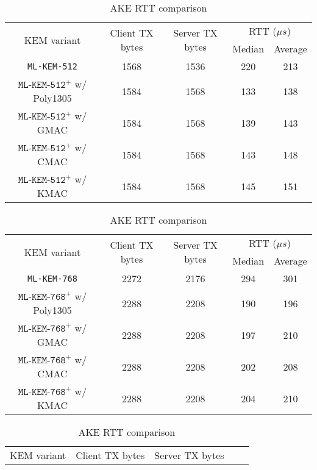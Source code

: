 \documentclass[journal=tches,submission]{iacrtrans}
\newcommand{\us}{\mu s}
\begin{document}
\begin{table}[h]
    \centering
    \footnotesize
    \caption{AKE RTT comparison}\label{tbl:ake-rtt}
    \begin{tabular}{|c|c|c|c|c|}
        \hline
        \multirow{2}{*}{KEM variant}
        & \multirow{2}{*}{Client TX bytes}
        & \multirow{2}{*}{Server TX bytes}
        & \multicolumn{2}{|c|}{RTT ($\us$)} \\
        \cline{4-5}
        & & & Median & Average \\
        \hline
        \texttt{ML-KEM-512} & 1568 & 1536 & 220 & 213 \\
        \hline
        $\texttt{ML-KEM-512}^+$ w/ Poly1305 & 1584 & 1568 & 133 & 138 \\
        \hline
        $\texttt{ML-KEM-512}^+$ w/ GMAC & 1584 & 1568 & 139 & 143 \\
        \hline
        $\texttt{ML-KEM-512}^+$ w/ CMAC & 1584 & 1568 & 143 & 148 \\
        \hline
        $\texttt{ML-KEM-512}^+$ w/ KMAC & 1584 & 1568 & 145 & 151 \\
        \hline
    \end{tabular}\vspace{0.3cm}
    \begin{tabular}{|c|c|c|c|c|}
        \hline
        \multirow{2}{*}{KEM variant}
        & \multirow{2}{*}{Client TX bytes}
        & \multirow{2}{*}{Server TX bytes}
        & \multicolumn{2}{|c|}{RTT ($\us$)} \\
        \cline{4-5}
        & & & Median & Average \\
        \hline
        \texttt{ML-KEM-768} & 2272 & 2176 & 294 & 301 \\
        \hline
        $\texttt{ML-KEM-768}^+$ w/ Poly1305 & 2288 & 2208 & 190 & 196 \\
        \hline
        $\texttt{ML-KEM-768}^+$ w/ GMAC & 2288 & 2208 & 197 & 210 \\
        \hline
        $\texttt{ML-KEM-768}^+$ w/ CMAC & 2288 & 2208 & 202 & 208 \\
        \hline
        $\texttt{ML-KEM-768}^+$ w/ KMAC & 2288 & 2208 & 204 & 210 \\
        \hline
    \end{tabular}\vspace{0.3cm}
    \begin{tabular}{|c|c|c|c|c|}
        \hline
        \multirow{2}{*}{KEM variant}
        & \multirow{2}{*}{Client TX bytes}
        & \multirow{2}{*}{Server TX bytes}

\end{tabular}
\end{table}
\end{document}
